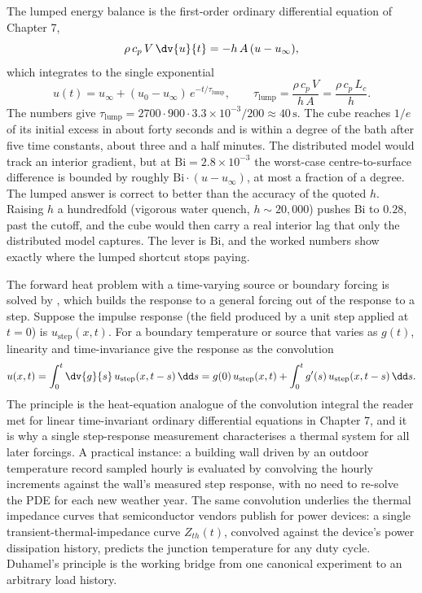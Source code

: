 The lumped energy balance is the first-order ordinary differential
equation of Chapter 7,
\[
\rho\, c_{p}\, V\, \dv{u}{t} = -h\, A\,(u - u_{\infty}),
\]
which integrates to the single exponential
\[
u(t) = u_{\infty} + (u_{0} - u_{\infty})\, e^{-t/\tau_{\text{lump}}},
\qquad
\tau_{\text{lump}} = \frac{\rho\, c_{p}\, V}{h\, A} = \frac{\rho\, c_{p}\, L_{c}}{h}.
\]
The numbers give $\tau_{\text{lump}} = 2700 \cdot 900 \cdot 3.3
\times 10^{-3}/200 \approx 40\,\si{\second}$. The cube reaches
$1/e$ of its initial excess in about forty seconds and is within a
degree of the bath after five time constants, about three and a
half minutes. The distributed model would track an interior
gradient, but at $\text{Bi} = 2.8 \times 10^{-3}$ the worst-case
centre-to-surface difference is bounded by roughly
$\text{Bi} \cdot (u - u_{\infty})$, at most a fraction of a degree.
The lumped answer is correct to better than the accuracy of the
quoted $h$. Raising $h$ a hundredfold (vigorous water quench,
$h \sim 20{,}000$) pushes $\text{Bi}$ to $0.28$, past the cutoff,
and the cube would then carry a real interior lag that only the
distributed model captures. The lever is $\text{Bi}$, and the
worked numbers show exactly where the lumped shortcut stops paying.

\begin{mastery}
The forward heat problem with a time-varying source or boundary
forcing is solved by , which builds
the response to a general forcing out of the response to a step.
Suppose the impulse response (the field produced by a unit step
applied at $t = 0$) is $u_{\text{step}}(x, t)$. For a boundary
temperature or source that varies as $g(t)$, linearity and
time-invariance give the response as the convolution
\[
u(x, t) = \int_{0}^{t} \dv{g}{s}\, u_{\text{step}}(x, t - s)\, \dd s
        = g(0)\, u_{\text{step}}(x, t) + \int_{0}^{t} g'(s)\, u_{\text{step}}(x, t - s)\, \dd s.
\]
The principle is the heat-equation analogue of the convolution
integral the reader met for linear time-invariant ordinary
differential equations in Chapter 7, and it is why a single
step-response measurement characterises a thermal system for all
later forcings. A practical instance: a building wall driven by an
outdoor temperature record sampled hourly is evaluated by
convolving the hourly increments against the wall's measured
step response, with no need to re-solve the PDE for each new
weather year. The same convolution underlies the thermal
impedance curves that semiconductor vendors publish for power
devices: a single transient-thermal-impedance curve $Z_{th}(t)$,
convolved against the device's power dissipation history, predicts
the junction temperature for any duty cycle. Duhamel's principle
is the working bridge from one canonical experiment to an
arbitrary load history.
\end{mastery}

